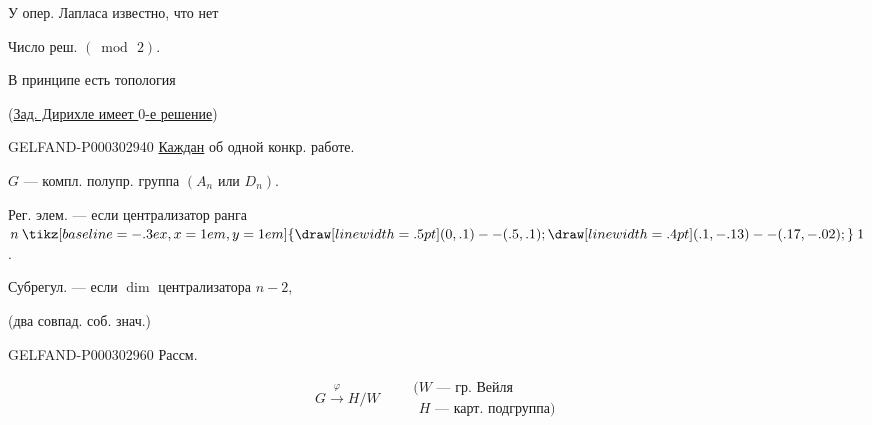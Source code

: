 У опер. Лапласа известно, что нет

Число реш. $(\bmod\,2)$.

В принципе  есть топология

(\underline{Зад. Дирихле имеет $0$-е решение})

\begin{center}\end{center}

\begin{GelfandAdjacentEvidence}{GELFAND-P000302}{940}
\underline{Каждан} об одной конкр. работе.

$G$ --- компл. полупр. группа $(A_n\text{ или }D_n)$.

Рег. элем. --- если централизатор ранга \underline{\underline{$n\mathbin{\tikz[baseline=-.3ex,x=1em,y=1em]{\draw[line width=.5pt](0,.1)--(.5,.1);\draw[line width=.4pt](.1,-.13)--(.17,-.02);}}1$}}.

Субрегул. --- если $\dim$ централизатора \underline{\underline{$n-2$}},

(два совпад. соб. знач.)

\end{GelfandAdjacentEvidence}


\begin{GelfandAdjacentEvidence}{GELFAND-P000302}{960}
Рассм.

\begin{equation*}G\overset{\varphi}{\longrightarrow}H/W\qquad\begin{array}{l}(W\text{ --- гр. Вейля}\\\phantom{(}H\text{ --- карт. подгруппа})\end{array}\end{equation*}\end{GelfandAdjacentEvidence}

